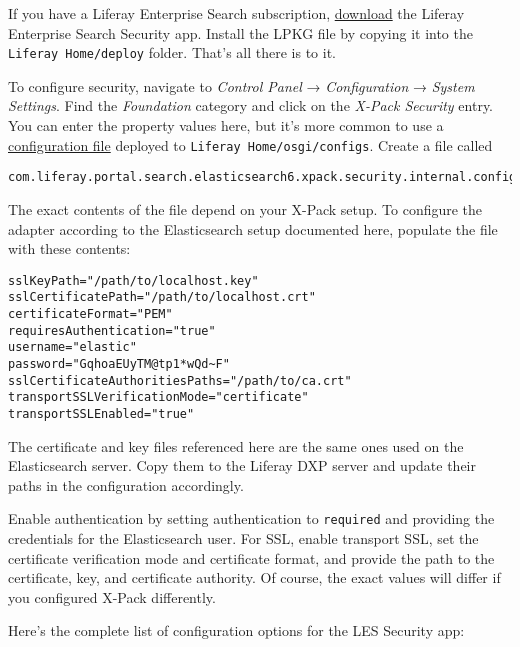 If you have a Liferay Enterprise Search subscription,
\href{https://web.liferay.com/group/customer/dxp/downloads/enterprise-search}{download}
the Liferay Enterprise Search Security app. Install the LPKG file by
copying it into the \texttt{Liferay\ Home/deploy} folder. That's all
there is to it.

To configure security, navigate to \emph{Control Panel} →
\emph{Configuration} → \emph{System Settings}. Find the
\emph{Foundation} category and click on the \emph{X-Pack Security}
entry. You can enter the property values here, but it's more common to
use a
\href{/docs/7-0/user/-/knowledge_base/u/understanding-system-configuration-files}{configuration
file} deployed to \texttt{Liferay\ Home/osgi/configs}. Create a file
called

\begin{verbatim}
com.liferay.portal.search.elasticsearch6.xpack.security.internal.configuration.XPackSecurityConfiguration.config
\end{verbatim}

The exact contents of the file depend on your X-Pack setup. To configure
the adapter according to the Elasticsearch setup documented here,
populate the file with these contents:

\begin{verbatim}
sslKeyPath="/path/to/localhost.key"
sslCertificatePath="/path/to/localhost.crt"
certificateFormat="PEM"
requiresAuthentication="true"
username="elastic"
password="GqhoaEUyTM@tp1*wQd~F"
sslCertificateAuthoritiesPaths="/path/to/ca.crt"
transportSSLVerificationMode="certificate"
transportSSLEnabled="true"
\end{verbatim}

The certificate and key files referenced here are the same ones used on
the Elasticsearch server. Copy them to the Liferay DXP server and update
their paths in the configuration accordingly.

Enable authentication by setting authentication to \texttt{required} and
providing the credentials for the Elasticsearch user. For SSL, enable
transport SSL, set the certificate verification mode and certificate
format, and provide the path to the certificate, key, and certificate
authority. Of course, the exact values will differ if you configured
X-Pack differently.

Here's the complete list of configuration options for the LES Security
app:

